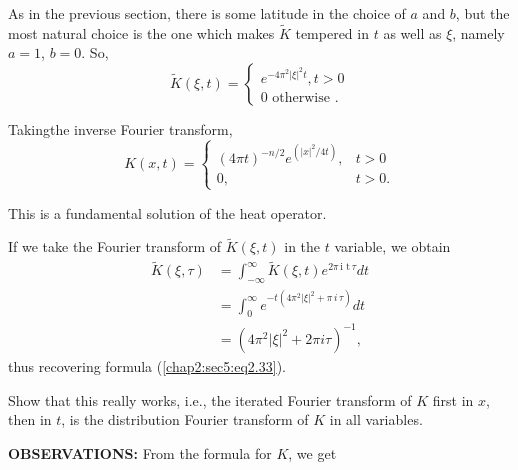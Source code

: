 As in the previous section, there is some latitude in the choice of
$a$ and $b$, but the most natural choice is the one which makes
$\tilde{K}$ tempered in $t$ as well as $\xi$, namely $a=1$, $b=0$. So, 
$$
\tilde{K}(\xi,t) =
\begin{cases}
e^{- 4 \pi^2 |\xi|^2 t}, t>0\\
0 \text { otherwise }.
\end{cases}
$$

Taking\pageoriginale the inverse Fourier transform, 
$$
K(x,t) =
\begin{cases}
(4 \pi t)^{-n/2} e^{(|x|^2 /4t)}, &t>0\\
0, &t>0.
\end{cases}
$$

This is a fundamental solution of the heat operator.

\setcounter{rem}{33}
\begin{rem}\label{chap2:sec5:rem2.34}%
If we take the Fourier transform of $\tilde{K} (\xi, t)$ in the $t$
variable, we obtain 
\begin{align*}
  \tilde{K} (\xi, \tau) & = \int^\infty_{- \infty} \tilde{K}(\xi, t )
  e^{2 \pi \, \text{i t}\,  \tau} dt\\ 
  & = \int^\infty_0 e^{-t (4 \pi^2 |\xi|^2 + \pi \,i \, \tau)}dt\\
  & = (4 \pi^2 |\xi|^2 + 2 \pi i \tau)^{-1},
\end{align*}
thus recovering formula (\ref{chap2:sec5:eq2.33}).
\end{rem}

\begin{exercise}%
Show that this really works, i.e., the iterated Fourier transform of $K$
first in $x$, then in $t$, is the distribution Fourier transform of $K$
in all variables. 
\end{exercise}

\textbf{OBSERVATIONS:} From the formula for $K$, we get

